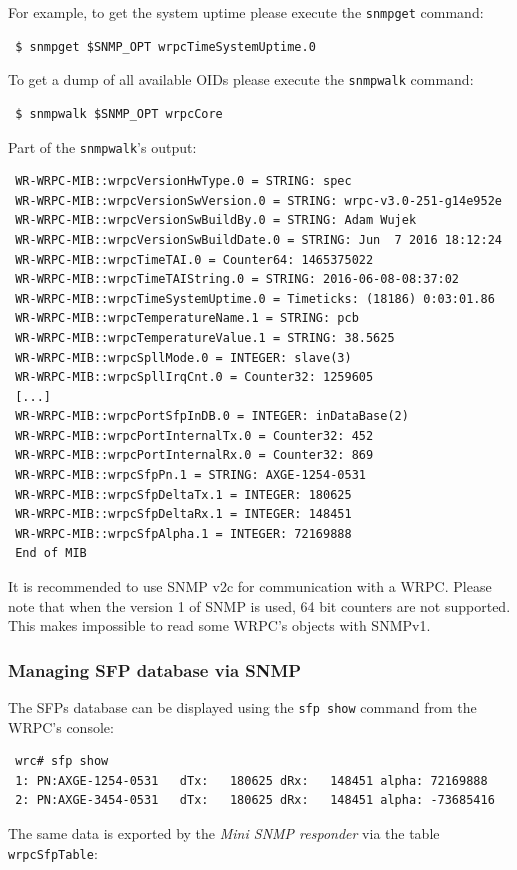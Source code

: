 \documentclass[a4paper, 12pt]{article}
\begin{document}
For example, to get the system uptime please execute the \texttt{snmpget} command:
\begin{lstlisting}
 $ snmpget $SNMP_OPT wrpcTimeSystemUptime.0
\end{lstlisting}
To get a dump of all available OIDs please execute the \texttt{snmpwalk}
command:
\begin{lstlisting}
 $ snmpwalk $SNMP_OPT wrpcCore
\end{lstlisting}
Part of the \texttt{snmpwalk}'s output:
\begin{lstlisting}
 WR-WRPC-MIB::wrpcVersionHwType.0 = STRING: spec
 WR-WRPC-MIB::wrpcVersionSwVersion.0 = STRING: wrpc-v3.0-251-g14e952e
 WR-WRPC-MIB::wrpcVersionSwBuildBy.0 = STRING: Adam Wujek
 WR-WRPC-MIB::wrpcVersionSwBuildDate.0 = STRING: Jun  7 2016 18:12:24
 WR-WRPC-MIB::wrpcTimeTAI.0 = Counter64: 1465375022
 WR-WRPC-MIB::wrpcTimeTAIString.0 = STRING: 2016-06-08-08:37:02
 WR-WRPC-MIB::wrpcTimeSystemUptime.0 = Timeticks: (18186) 0:03:01.86
 WR-WRPC-MIB::wrpcTemperatureName.1 = STRING: pcb
 WR-WRPC-MIB::wrpcTemperatureValue.1 = STRING: 38.5625
 WR-WRPC-MIB::wrpcSpllMode.0 = INTEGER: slave(3)
 WR-WRPC-MIB::wrpcSpllIrqCnt.0 = Counter32: 1259605
 [...]
 WR-WRPC-MIB::wrpcPortSfpInDB.0 = INTEGER: inDataBase(2)
 WR-WRPC-MIB::wrpcPortInternalTx.0 = Counter32: 452
 WR-WRPC-MIB::wrpcPortInternalRx.0 = Counter32: 869
 WR-WRPC-MIB::wrpcSfpPn.1 = STRING: AXGE-1254-0531
 WR-WRPC-MIB::wrpcSfpDeltaTx.1 = INTEGER: 180625
 WR-WRPC-MIB::wrpcSfpDeltaRx.1 = INTEGER: 148451
 WR-WRPC-MIB::wrpcSfpAlpha.1 = INTEGER: 72169888
 End of MIB
\end{lstlisting}

It is recommended to use SNMP v2c for communication with a WRPC.
Please note that when the version 1 of SNMP is used, 64 bit counters are not
supported. This makes impossible to read some WRPC's objects with
SNMPv1.

\subsubsection{Managing SFP database via SNMP}
\label{Managing SFP database via SNMP}

The SFPs database can be displayed using the \texttt{sfp show} command from
the WRPC's console:
\begin{lstlisting}
 wrc# sfp show
 1: PN:AXGE-1254-0531   dTx:   180625 dRx:   148451 alpha: 72169888
 2: PN:AXGE-3454-0531   dTx:   180625 dRx:   148451 alpha: -73685416
\end{lstlisting}
The same data is exported by the \textit{Mini SNMP responder} via the table
\texttt{wrpcSfpTable}:
\end{document}
